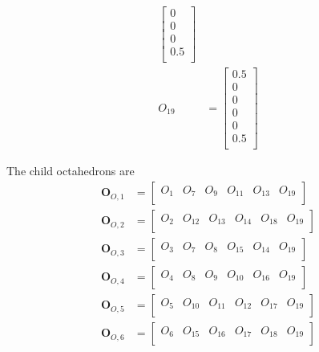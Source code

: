 \documentclass{mitschrift}
\begin{document}
\begin{align}
\begin{bmatrix}
        0 \\
        0 \\
        0 \\
        0.5 \\
    \end{bmatrix} \\
    O_{19} &= \begin{bmatrix}
        0.5 \\
        0 \\
        0 \\
        0 \\
        0 \\
        0.5 \\
    \end{bmatrix}
\end{align}

The child octahedrons are \begin{align}
    \mathbf{O}_{O,1} &= \begin{bmatrix}
        O_1 & O_7 & O_{9} & O_{11} & O_{13} & O_{19} \\
    \end{bmatrix} \\
    \mathbf{O}_{O,2} &= \begin{bmatrix}
        O_2 & O_{12} & O_{13} & O_{14}& O_{18} & O_{19} \\
    \end{bmatrix} \\
    \mathbf{O}_{O,3} &= \begin{bmatrix}
        O_3 & O_{7} & O_{8} & O_{15}& O_{14} & O_{19} \\
    \end{bmatrix} \\
    \mathbf{O}_{O,4} &= \begin{bmatrix}
        O_4 & O_{8} & O_{9} & O_{10}& O_{16} & O_{19} \\
    \end{bmatrix} \\
    \mathbf{O}_{O,5} &= \begin{bmatrix}
        O_5 & O_{10} & O_{11} & O_{12}& O_{17} & O_{19} \\
    \end{bmatrix} \\
    \mathbf{O}_{O,6} &= \begin{bmatrix}
        O_6 & O_{15} & O_{16} & O_{17}& O_{18} & O_{19} \\
    \end{bmatrix}
\end{align}
\end{document}
